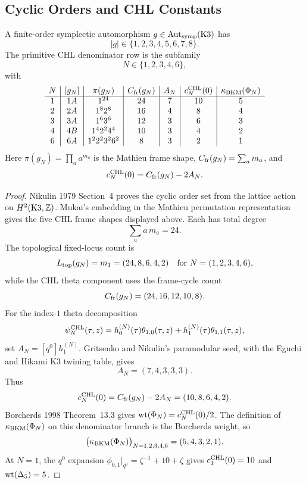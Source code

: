 \subsection*{Cyclic Orders and CHL Constants}

\begin{theorem}
\label{wn:thm:mukai-nikulin-chl-constants}
A finite-order symplectic automorphism $g\in\mathrm{Aut}_{\mathrm{symp}}(\mathrm{K3})$ has
\[
  |g|\in\{1,2,3,4,5,6,7,8\}.
\]
The primitive CHL denominator row is the subfamily
\[
  N\in\{1,2,3,4,6\},
\]
with
\[
\begin{array}{c|c|c|c|c|c|c}
N & [g_N] & \pi(g_N) & C_{\mathrm{fr}}(g_N) & A_N
& c_N^{\mathrm{CHL}}(0) & \kappa_{\mathrm{BKM}}(\Phi_N)\\
\hline
1 & 1A & 1^{24} & 24 & 7 & 10 & 5\\
2 & 2A & 1^8 2^8 & 16 & 4 & 8 & 4\\
3 & 3A & 1^6 3^6 & 12 & 3 & 6 & 3\\
4 & 4B & 1^4 2^2 4^4 & 10 & 3 & 4 & 2\\
6 & 6A & 1^2 2^2 3^2 6^2 & 8 & 3 & 2 & 1
\end{array}
\]
Here $\pi(g_N)=\prod_a a^{m_a}$ is the Mathieu frame shape,
$C_{\mathrm{fr}}(g_N)=\sum_a m_a$, and
\[
  c_N^{\mathrm{CHL}}(0)=C_{\mathrm{fr}}(g_N)-2A_N.
\]
\end{theorem}
\begin{proof}
Nikulin 1979 Section~4 proves the cyclic order set from the lattice
action on $H^2(\mathrm{K3},\mathbb Z)$.  Mukai's embedding in the Mathieu
permutation representation gives the five CHL frame shapes displayed
above.  Each has total degree
\[
  \sum_a a\,m_a=24.
\]
The topological fixed-locus count is
\[
  L_{\mathrm{top}}(g_N)=m_1=(24,8,6,4,2)
  \quad\text{for }N=(1,2,3,4,6),
\]
while the CHL theta component uses the frame-cycle count
\[
  C_{\mathrm{fr}}(g_N)=(24,16,12,10,8).
\]
For the index-$1$ theta decomposition
\[
  \psi_N^{\mathrm{CHL}}(\tau,z)
  =h^{(N)}_0(\tau)\theta_{1,0}(\tau,z)
   +h^{(N)}_1(\tau)\theta_{1,1}(\tau,z),
\]
set $A_N=[q^0]h^{(N)}_1$.  Gritsenko and Nikulin's paramodular seed,
with the Eguchi and Hikami K3 twining table, gives
\[
  A_N=(7,4,3,3,3).
\]
Thus
\[
  c_N^{\mathrm{CHL}}(0)=C_{\mathrm{fr}}(g_N)-2A_N=(10,8,6,4,2).
\]
Borcherds 1998 Theorem~13.3 gives
$\operatorname{wt}(\Phi_N)=c_N^{\mathrm{CHL}}(0)/2$.  The definition of
$\kappa_{\mathrm{BKM}}(\Phi_N)$ on this denominator branch is the Borcherds weight,
so
\[
  \bigl(\kappa_{\mathrm{BKM}}(\Phi_N)\bigr)_{N=1,2,3,4,6}=(5,4,3,2,1).
\]
At $N=1$, the $q^0$ expansion
$\phi_{0,1}|_{q^0}=\zeta^{-1}+10+\zeta$ gives
$c_1^{\mathrm{CHL}}(0)=10$ and $\operatorname{wt}(\Delta_5)=5$.
\end{proof}

